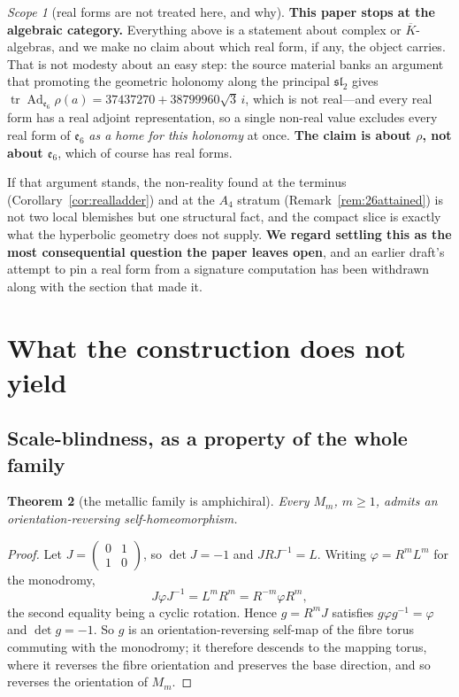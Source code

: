 \documentclass[11pt,reqno]{amsart}
\theoremstyle{plain}
\newtheorem{theorem}{Theorem}[section]
\theoremstyle{definition}
\theoremstyle{remark}
\newtheorem{scope}[theorem]{Scope}
\newcommand{\sll}{\mathfrak{sl}}
\newcommand{\ee}{\mathfrak{e}}
\begin{document}
\begin{scope}[real forms are not treated here, and why]\label{sc:norealform2}
\textbf{This paper stops at the algebraic category.} Everything above is a statement
about complex or $\overline K$-algebras, and we make no claim about which real form, if
any, the object carries. That is not modesty about an easy step: the source material
banks an argument that promoting the geometric holonomy along the principal $\sll_2$
gives $\operatorname{tr}\operatorname{Ad}_{\ee_6}\rho(a)=37437270+38799960\sqrt3\,i$,
which is not real---and every real form has a real adjoint representation, so a single
non-real value excludes every real form of $\ee_6$ \emph{as a home for this holonomy} at
once. \textbf{The claim is about $\rho$, not about $\ee_6$}, which of course has real
forms.

If that argument stands, the non-reality found at the terminus
(Corollary~\ref{cor:realladder}) and at the $A_4$ stratum (Remark~\ref{rem:26attained})
is not two local blemishes but one structural fact, and the compact slice is exactly
what the hyperbolic geometry does not supply. \textbf{We regard settling this as the most
consequential question the paper leaves open}, and an earlier draft's attempt to pin a
real form from a signature computation has been withdrawn along with the section that
made it.
\end{scope}

\section{What the construction does not yield}\label{sec:negatives}

\subsection{Scale-blindness, as a property of the whole family}

\begin{theorem}[the metallic family is amphichiral]\label{thm:amphi}
Every $M_m$, $m\ge1$, admits an orientation-reversing self-homeomorphism.
\end{theorem}

\begin{proof}
Let $J=\left(\begin{smallmatrix}0&1\\1&0\end{smallmatrix}\right)$, so $\det J=-1$ and
$JRJ^{-1}=L$. Writing $\varphi=R^mL^m$ for the monodromy,
\[
   J\varphi J^{-1}=L^mR^m=R^{-m}\varphi R^m ,
\]
the second equality being a cyclic rotation. Hence $g=R^mJ$ satisfies
$g\varphi g^{-1}=\varphi$ and $\det g=-1$. So $g$ is an orientation-reversing self-map of
the fibre torus commuting with the monodromy; it therefore descends to the mapping torus,
where it reverses the fibre orientation and preserves the base direction, and so reverses
the orientation of $M_m$.
\end{proof}
\end{document}
